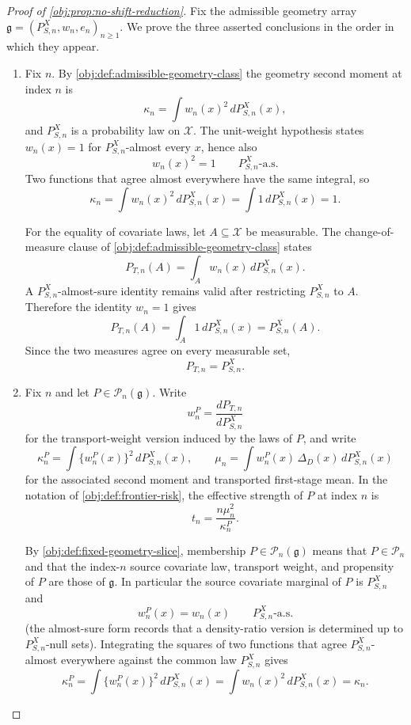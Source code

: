 \documentclass[11pt]{article}
\begin{document}
\begin{proof}[Proof of \cref{obj:prop:no-shift-reduction}]
Fix the admissible geometry array \(\mathfrak g=(P_{S,n}^X,w_n,e_n)_{n\ge1}\). We prove the three asserted conclusions in the order in which they appear.

\begin{enumerate}
\item Fix \(n\).  By \cref{obj:def:admissible-geometry-class} the geometry second moment at index \(n\) is
\[
\kappa_n
=
\int w_n(x)^2\,dP_{S,n}^X(x),
\]
and \(P_{S,n}^X\) is a probability law on \(\mathcal X\).
The unit-weight hypothesis states \(w_n(x)=1\) for \(P_{S,n}^X\)-almost every \(x\), hence also
\[
w_n(x)^2=1
\qquad
P_{S,n}^X\text{-a.s.}
\]
Two functions that agree almost everywhere have the same integral, so
\[
\kappa_n
=
\int w_n(x)^2\,dP_{S,n}^X(x)
=
\int 1\,dP_{S,n}^X(x)
=
1 .
\]

For the equality of covariate laws, let \(A\subseteq\mathcal X\) be measurable.  The change-of-measure clause of \cref{obj:def:admissible-geometry-class} states
\[
P_{T,n}(A)
=
\int_A w_n(x)\,dP_{S,n}^X(x).
\]
A \(P_{S,n}^X\)-almost-sure identity remains valid after restricting \(P_{S,n}^X\) to \(A\).  Therefore the identity \(w_n=1\) gives
\[
P_{T,n}(A)
=
\int_A 1\,dP_{S,n}^X(x)
=
P_{S,n}^X(A).
\]
Since the two measures agree on every measurable set,
\[
P_{T,n}=P_{S,n}^X .
\]

\item Fix \(n\) and let \(P\in\mathcal P_n(\mathfrak g)\).  Write
\[
w_n^P=\frac{dP_{T,n}}{dP_{S,n}^X}
\]
for the transport-weight version induced by the laws of \(P\), and write
\[
\kappa_n^P
=
\int \bigl\{w_n^P(x)\bigr\}^2\,dP_{S,n}^X(x),
\qquad
\mu_n
=
\int w_n^P(x)\,\Delta_D(x)\,dP_{S,n}^X(x)
\]
for the associated second moment and transported first-stage mean.  In the notation of \cref{obj:def:frontier-risk}, the effective strength of \(P\) at index \(n\) is
\[
t_n
=
\frac{n\mu_n^2}{\kappa_n^P}.
\]

By \cref{obj:def:fixed-geometry-slice}, membership \(P\in\mathcal P_n(\mathfrak g)\) means that \(P\in\mathcal P_n\) and that the index-\(n\) source covariate law, transport weight, and propensity of \(P\) are those of \(\mathfrak g\).  In particular the source covariate marginal of \(P\) is \(P_{S,n}^X\) and
\[
w_n^P(x)=w_n(x)
\qquad
P_{S,n}^X\text{-a.s.}
\]
(the almost-sure form records that a density-ratio version is determined up to \(P_{S,n}^X\)-null sets).  Integrating the squares of two functions that agree \(P_{S,n}^X\)-almost everywhere against the common law \(P_{S,n}^X\) gives
\[
\kappa_n^P
=
\int \bigl\{w_n^P(x)\bigr\}^2\,dP_{S,n}^X(x)
=
\int w_n(x)^2\,dP_{S,n}^X(x)
=
\kappa_n .
\]


\end{enumerate}
\end{proof}
\end{document}
